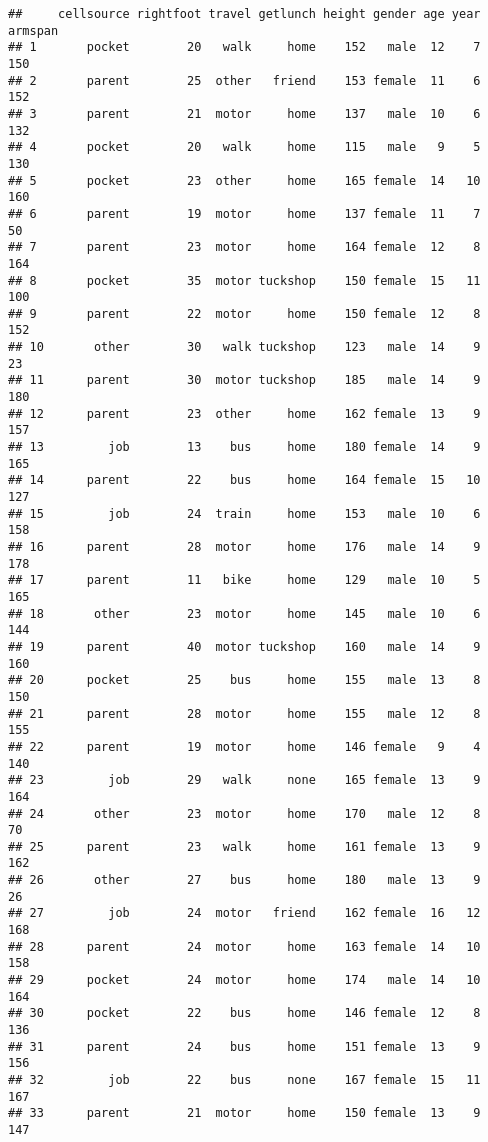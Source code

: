 \documentclass[
]{article}
\begin{document}
\begin{verbatim}
##     cellsource rightfoot travel getlunch height gender age year armspan
## 1       pocket        20   walk     home    152   male  12    7     150
## 2       parent        25  other   friend    153 female  11    6     152
## 3       parent        21  motor     home    137   male  10    6     132
## 4       pocket        20   walk     home    115   male   9    5     130
## 5       pocket        23  other     home    165 female  14   10     160
## 6       parent        19  motor     home    137 female  11    7      50
## 7       parent        23  motor     home    164 female  12    8     164
## 8       pocket        35  motor tuckshop    150 female  15   11     100
## 9       parent        22  motor     home    150 female  12    8     152
## 10       other        30   walk tuckshop    123   male  14    9      23
## 11      parent        30  motor tuckshop    185   male  14    9     180
## 12      parent        23  other     home    162 female  13    9     157
## 13         job        13    bus     home    180 female  14    9     165
## 14      parent        22    bus     home    164 female  15   10     127
## 15         job        24  train     home    153   male  10    6     158
## 16      parent        28  motor     home    176   male  14    9     178
## 17      parent        11   bike     home    129   male  10    5     165
## 18       other        23  motor     home    145   male  10    6     144
## 19      parent        40  motor tuckshop    160   male  14    9     160
## 20      pocket        25    bus     home    155   male  13    8     150
## 21      parent        28  motor     home    155   male  12    8     155
## 22      parent        19  motor     home    146 female   9    4     140
## 23         job        29   walk     none    165 female  13    9     164
## 24       other        23  motor     home    170   male  12    8      70
## 25      parent        23   walk     home    161 female  13    9     162
## 26       other        27    bus     home    180   male  13    9      26
## 27         job        24  motor   friend    162 female  16   12     168
## 28      parent        24  motor     home    163 female  14   10     158
## 29      pocket        24  motor     home    174   male  14   10     164
## 30      pocket        22    bus     home    146 female  12    8     136
## 31      parent        24    bus     home    151 female  13    9     156
## 32         job        22    bus     none    167 female  15   11     167
## 33      parent        21  motor     home    150 female  13    9     147

\end{verbatim}
\end{document}
